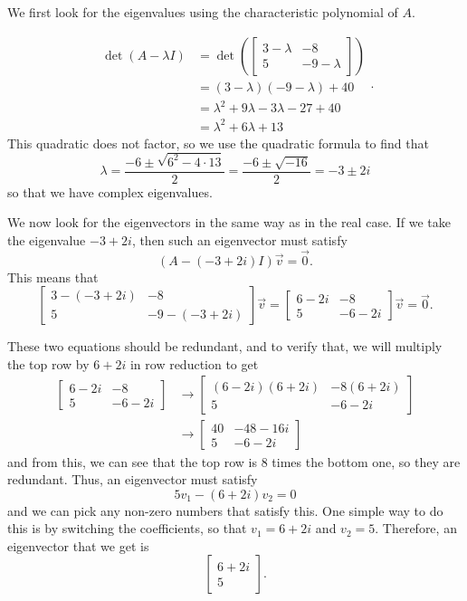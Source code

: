 \begin{exampleSol}
We first look for the eigenvalues using the characteristic polynomial of $A$. 

\[ \begin{split}
\det(A - \lambda I) &= \det \left( \begin{bmatrix} 3-\lambda & -8 \\ 5 & -9 -\lambda \end{bmatrix} \right) \\ 
&= (3-\lambda)(-9-\lambda) + 40 \\
&= \lambda^2 + 9\lambda - 3\lambda - 27+40 \\
&= \lambda^2 + 6\lambda + 13
\end{split}. \]
This quadratic does not factor, so we use the quadratic formula to find that 
\[ \lambda = \frac{-6 \pm \sqrt{6^2 - 4\cdot 13}}{2} = \frac{-6 \pm \sqrt{-16}}{2}  = -3\pm 2i \] so that we have complex eigenvalues. 

We now look for the eigenvectors in the same way as in the real case. If we take the eigenvalue $-3+2i$, then such an eigenvector must satisfy
\[ (A - (-3+2i)I)\vec{v} = \vec{0}. \] 
This means that 
\[\begin{bmatrix} 3-(-3+2i) & -8 \\ 5 & -9-(-3+2i) \end{bmatrix}\vec{v} = \begin{bmatrix} 6-2i & -8 \\ 5 & -6-2i \end{bmatrix}\vec{v} = \vec{0}. \]

These two equations should be redundant, and to verify that, we will multiply the top row by $6+2i$ in row reduction to get
\[ \begin{split}
 \begin{bmatrix} 6-2i & -8 \\ 5 & -6-2i \end{bmatrix} &\rightarrow  \begin{bmatrix} (6-2i)(6+2i) & -8(6+2i) \\ 5 & -6-2i \end{bmatrix} \\
 &\rightarrow \begin{bmatrix} 40 & -48 - 16i \\ 5 & -6-2i \end{bmatrix}
\end{split} \] and from this, we can see that the top row is 8 times the bottom one, so they are redundant. Thus, an eigenvector must satisfy \[5v_1- (6+2i)v_2 = 0 \] and we can pick any non-zero numbers that satisfy this. One simple way to do this is by switching the coefficients, so that $v_1 = 6+2i$ and $v_2 = 5$. Therefore, an eigenvector that we get is 
\[ \begin{bmatrix} 6+2i \\ 5 \end{bmatrix}. \]


\end{exampleSol}
